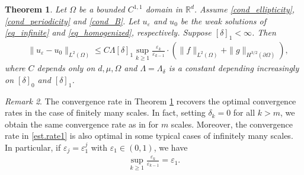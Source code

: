 \documentclass[reqno,12pt]{amsart} %
\newtheorem{theorem}{Theorem}[section]
\theoremstyle{definition}
\theoremstyle{remark}
\newtheorem{remark}[theorem]{Remark}
\numberwithin{equation}{section}
\newcommand{\R}{\mathbb{R}}
\newcommand{\e}{\varepsilon}
\begin{document}
\begin{theorem}\label{thm.L2rates}
    Let $\Omega$ be a bounded $C^{1,1}$ domain in $\R^d$. Assume \eqref{cond_ellipticity}, \eqref{cond_periodicity} and \eqref{cond_B}.
    Let $u_\e$ and $u_0$ be the weak solutions of \eqref{eq_infinite} and \eqref{eq_homogenized}, respectively.
    Suppose $ [\delta]_1 < \infty$. Then
        \begin{align}\label{est.rate1}
        \quad \|u_\varepsilon-u_0\|_{L^2(\Omega)}\leq C\Lambda [\delta]_1\sup_{k\geq 1} \frac{\varepsilon_k}{\varepsilon_{k-1}} \cdot\left(\|f\|_{L^2(\Omega)}+\|g\|_{H^{3/2}(\partial\Omega)}\right),
        \end{align}
        where $C$ depends only on $d, \mu, \Omega$ and $\Lambda = \Lambda_\delta$ is a constant depending increasingly on $[\delta]_0$ and $[\delta]_1$.

\end{theorem}

\begin{remark}\label{rmk.typicalcase}
    The convergence rate in Theorem \ref{thm.L2rates} recovers the optimal convergence rates in the case of finitely many scales. In fact, setting $\delta_k = 0$ for all $k > m$, we obtain the same convergence rate as in \cite{Niu20_reiterated} for $m$ scales. Moreover, the convergence rate in \eqref{est.rate1}
    is also optimal in some typical cases of infinitely many scales. In particular, if $\varepsilon_j=\varepsilon_1^j$ with 
    $\e_1 \in (0,1)$, we have
    \begin{align*}
        \sup_{k\geq 1} \frac{\e_k}{\e_{k-1}}=\varepsilon_1. 
    \end{align*}
\end{remark}
\end{document}
